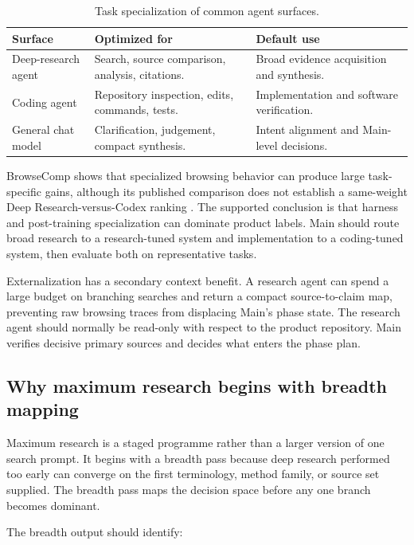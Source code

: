 \documentclass[11pt,a4paper]{article}
\begin{document}
\begin{table}[H]
\centering
\caption{Task specialization of common agent surfaces.}
\begin{tabularx}{\textwidth}{P{0.21\textwidth}P{0.32\textwidth}Y}
\toprule
\textbf{Surface} & \textbf{Optimized for} & \textbf{Default use} \\
\midrule
Deep-research agent & Search, source comparison, analysis, citations. & Broad evidence acquisition and synthesis. \\
Coding agent & Repository inspection, edits, commands, tests. & Implementation and software verification. \\
General chat model & Clarification, judgement, compact synthesis. & Intent alignment and Main-level decisions. \\
\bottomrule
\end{tabularx}
\end{table}

BrowseComp shows that specialized browsing behavior can produce large task-specific gains, although its published comparison does not establish a same-weight Deep Research-versus-Codex ranking \cite{openaibrowsecomp2025}. The supported conclusion is that harness and post-training specialization can dominate product labels. Main should route broad research to a research-tuned system and implementation to a coding-tuned system, then evaluate both on representative tasks.

Externalization has a secondary context benefit. A research agent can spend a large budget on branching searches and return a compact source-to-claim map, preventing raw browsing traces from displacing Main's phase state. The research agent should normally be read-only with respect to the product repository. Main verifies decisive primary sources and decides what enters the phase plan.

\subsection{Why maximum research begins with breadth mapping}\label{sec:ultra-research-rationale}

Maximum research is a staged programme rather than a larger version of one search prompt. It begins with a breadth pass because deep research performed too early can converge on the first terminology, method family, or source set supplied. The breadth pass maps the decision space before any one branch becomes dominant.

The breadth output should identify:
\end{document}
